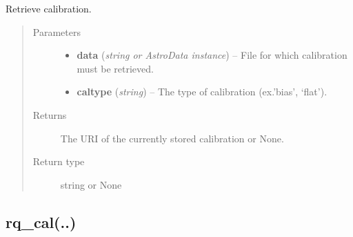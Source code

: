 \documentclass[letterpaper,10pt,english]{sphinxmanual}
\begin{document}
\begin{fulllineitems}
\label{chapter_ReductionContextClass:astrodata.RecipeManager.ReductionContext.get_cal}
Retrieve calibration.
\begin{quote}\begin{description}
\item[{Parameters}] \leavevmode\begin{itemize}
\item {} 
\textbf{data} (\emph{string or AstroData instance}) -- File for which calibration must be retrieved.

\item {} 
\textbf{caltype} (\emph{string}) -- The type of calibration (ex.'bias', `flat').

\end{itemize}

\item[{Returns}] \leavevmode
The URI of the currently stored calibration or None.

\item[{Return type}] \leavevmode
string or None

\end{description}\end{quote}

\end{fulllineitems}



\subsection{rq\_cal(..)}
\label{chapter_ReductionContextClass:rq-cal}
\end{document}
